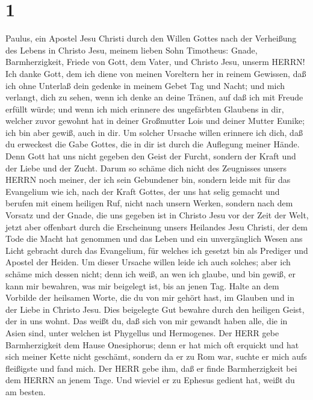 \hypertarget{section}{%
\section{1}\label{section}}

 Paulus, ein Apostel Jesu Christi durch den Willen Gottes
nach der Verheißung des Lebens in Christo Jesu,  meinem
lieben Sohn Timotheus: Gnade, Barmherzigkeit, Friede von Gott, dem
Vater, und Christo Jesu, unserm HERRN!  Ich danke Gott, dem
ich diene von meinen Voreltern her in reinem Gewissen, daß ich ohne
Unterlaß dein gedenke in meinem Gebet Tag und Nacht;  und
mich verlangt, dich zu sehen, wenn ich denke an deine Tränen, auf daß
ich mit Freude erfüllt würde;  und wenn ich mich erinnere
des ungefärbten Glaubens in dir, welcher zuvor gewohnt hat in deiner
Großmutter Lois und deiner Mutter Eunike; ich bin aber gewiß, auch in
dir.  Um solcher Ursache willen erinnere ich dich, daß du
erweckest die Gabe Gottes, die in dir ist durch die Auflegung meiner
Hände.  Denn Gott hat uns nicht gegeben den Geist der
Furcht, sondern der Kraft und der Liebe und der Zucht. 
Darum so schäme dich nicht des Zeugnisses unsers HERRN noch meiner, der
ich sein Gebundener bin, sondern leide mit für das Evangelium wie ich,
nach der Kraft Gottes,  der uns hat selig gemacht und
berufen mit einem heiligen Ruf, nicht nach unsern Werken, sondern nach
dem Vorsatz und der Gnade, die uns gegeben ist in Christo Jesu vor der
Zeit der Welt,  jetzt aber offenbart durch die Erscheinung
unsers Heilandes Jesu Christi, der dem Tode die Macht hat genommen und
das Leben und ein unvergänglich Wesen ans Licht gebracht durch das
Evangelium,  für welches ich gesetzt bin als Prediger und
Apostel der Heiden.  Um dieser Ursache willen leide ich
auch solches; aber ich schäme mich dessen nicht; denn ich weiß, an wen
ich glaube, und bin gewiß, er kann mir bewahren, was mir beigelegt ist,
bis an jenen Tag.  Halte an dem Vorbilde der heilsamen
Worte, die du von mir gehört hast, im Glauben und in der Liebe in
Christo Jesu.  Dies beigelegte Gut bewahre durch den
heiligen Geist, der in uns wohnt.  Das weißt du, daß sich
von mir gewandt haben alle, die in Asien sind, unter welchen ist
Phygellus und Hermogenes.  Der HERR gebe Barmherzigkeit dem
Hause Onesiphorus; denn er hat mich oft erquickt und hat sich meiner
Kette nicht geschämt,  sondern da er zu Rom war, suchte er
mich aufs fleißigste und fand mich.  Der HERR gebe ihm, daß
er finde Barmherzigkeit bei dem HERRN an jenem Tage. Und wieviel er zu
Ephesus gedient hat, weißt du am besten.

